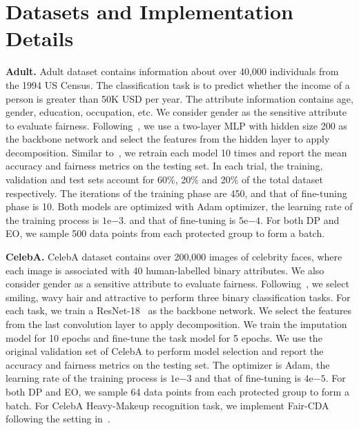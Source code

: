 
\section{Datasets and Implementation Details}\label{sec:implementation}

\noindent\textbf{Adult.} Adult dataset contains information about over 40,000 individuals from the 1994 US Census. The classification task is to predict whether the income of a person is greater than 50K USD per year. The attribute information contains age, gender, education, occupation, etc. We consider gender as the sensitive attribute to evaluate fairness. 
Following~\citet{chuang2021fair}, we use a two-layer MLP with hidden size 200 as the backbone network and select the features from the hidden layer to apply decomposition. Similar to~\citet{chuang2021fair}, we retrain each model 10 times and report the mean accuracy and fairness metrics on the testing set.
In each trial, the training, validation and test sets account for 60\%, 20\% and 20\% of the total dataset respectively. 
The iterations of the training phase are 450, and that of fine-tuning phase is 10. Both models are optimized with Adam optimizer, the learning rate of the training process is $1\mathrm{e}{-3}$. and that of fine-tuning is $5\mathrm{e}{-4}$. For both DP and EO, we sample 500 data points from each protected group to form a batch.


\noindent\textbf{CelebA.} CelebA dataset contains over 200,000 images of celebrity
faces, where each image is associated with 40 human-labelled binary attributes. We also consider gender as a sensitive attribute to evaluate fairness. Following~\cite{chuang2021fair}, we select smiling, wavy hair and attractive to perform three binary classification tasks. For each task, we train a ResNet-18~\cite{he2016deep} as the backbone network. We select the features from  the last convolution layer to apply decomposition. We train the imputation model for 10 epochs and fine-tune the task model for 5 epochs. We use the original validation set of CelebA to perform model selection and report the accuracy and fairness metrics on the testing set. The optimizer is Adam, the learning rate of the training process is $1\mathrm{e}{-3}$ and that of fine-tuning is $4\mathrm{e}{-5}$. For both DP and EO, we sample 64 data points from each protected group to form a batch. For CelebA Heavy-Makeup recognition task, we implement Fair-CDA following the setting in~\cite{creager2019flexibly}.


